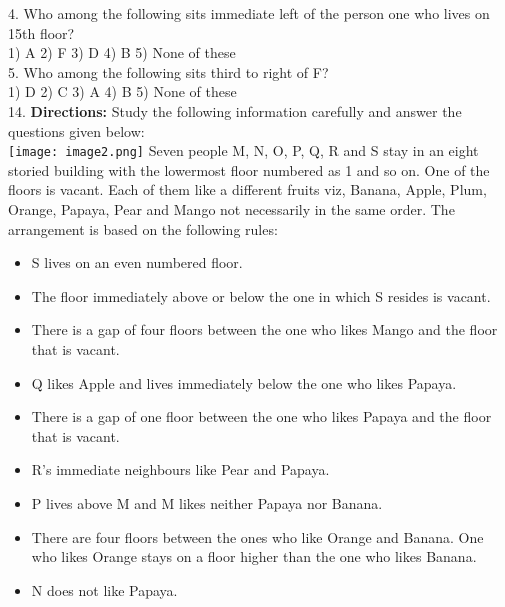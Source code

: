\documentclass[
]{article}
\begin{document}
4. Who among the following sits immediate left of the person one who lives on 15th floor?\\
1) A \hspace{2mm}2) F \hspace{2mm}3) D \hspace{2mm}4) B \hspace{2mm}5) None of these\\

5. Who among the following sits third to right of F?\\
1) D \hspace{2mm}2) C \hspace{2mm}3) A \hspace{2mm}4) B \hspace{2mm}5) None of these\\

14. \textbf{Directions:} Study the following information carefully and answer the questions given
below:\\
\texttt{[image: image2.png]}
Seven people M, N, O, P, Q, R and S stay in an eight storied building with the lowermost
floor numbered as 1 and so on. One of the floors is vacant. Each of them like a different
fruits viz, Banana, Apple, Plum, Orange, Papaya, Pear and Mango not necessarily in the
same order. The arrangement is based on the following rules:\\
\begin{itemize}
    \item S lives on an even numbered floor.
\item The floor immediately above or below the one in which S resides is vacant.
\item There is a gap of four floors between the one who likes Mango and the floor that is vacant.
\item Q likes Apple and lives immediately below the one who likes Papaya.
\item There is a gap of one floor between the one who likes Papaya and the floor that is vacant.
\item R's immediate neighbours like Pear and Papaya.
\item P lives above M and M likes neither Papaya nor Banana.
\item There are four floors between the ones who like Orange and Banana. One who likes
Orange stays on a floor higher than the one who likes Banana.
\item N does not like Papaya.
\end{itemize}
\end{document}
